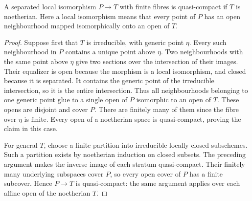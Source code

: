 \begin{lemma}\label{A:localiso-qc}
A separated local isomorphism $P\to T$ with finite fibres is
quasi-compact if $T$ is noetherian. Here a local isomorphism means
that every point of $P$ has an open neighbourhood mapped
isomorphically onto an open of $T$.
\end{lemma}
\begin{proof}
Suppose first that $T$ is irreducible, with generic point $\eta$.
Every such neighbourhood in $P$ contains a unique point above
$\eta$. Two neighbourhoods with the same point above $\eta$
give two sections over the intersection of their images. Their
equalizer is open because the morphism is a local isomorphism,
and closed because it is separated. It contains the generic point
of the irreducible intersection, so it is the entire intersection.
Thus all neighbourhoods belonging to one generic point glue to
a single open of $P$ isomorphic to an open of $T$. These opens
are disjoint and cover $P$. There are finitely many of them since
the fibre over $\eta$ is finite. Every open of a noetherian space
is quasi-compact, proving the claim in this case.

For general $T$, choose a finite partition into irreducible locally
closed subschemes. Such a partition exists by noetherian induction
on closed subsets. The preceding argument makes the inverse image
of each stratum quasi-compact. Their finitely many underlying
subspaces cover $P$, so every open cover of $P$ has a finite
subcover. Hence $P\to T$ is quasi-compact: the same argument applies
over each affine open of the noetherian $T$.
\end{proof}

